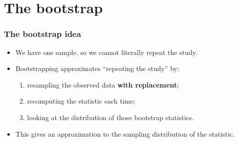 \documentclass[slidestop,compress,mathserif]{beamer}
\begin{document}
\section{The bootstrap}
\begin{frame}
\frametitle{The bootstrap idea}


\vspace{0.4em}
\begin{itemize}
\item We have one sample, so we cannot literally repeat the study.
\item Bootstrapping approximates ``repeating the study'' by:
  \begin{enumerate}
  \item resampling the observed data \textbf{with replacement};
  \item recomputing the statistic each time;
  \item looking at the distribution of those bootstrap statistics.
  \end{enumerate}
\item This gives an approximation to the sampling distribution of the statistic.
\end{itemize}

\end{frame}

\end{document}
